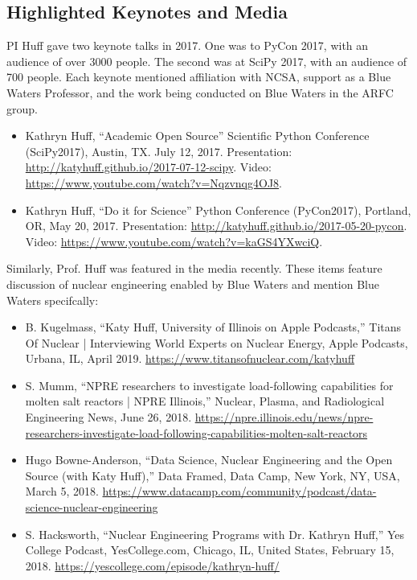 \documentclass[letterpaper]{article}
\begin{document}
\subsection{Highlighted Keynotes and Media}
PI Huff gave two keynote talks in 2017. One was to PyCon 2017, with an audience of over 3000 people. The 
second was at SciPy 2017, with an audience of 700 people. Each keynote 
mentioned affiliation with NCSA, support as a Blue Waters Professor, and 
the work being conducted on Blue Waters in the ARFC group. 


\begin{itemize}
\item Kathryn Huff, ``Academic Open Source'' Scientific Python Conference 
(SciPy2017), Austin, TX. July 12, 2017.  
Presentation: \url{http://katyhuff.github.io/2017-07-12-scipy}. Video: 
\url{https://www.youtube.com/watch?v=Nqzvnqg4OJ8}.
\item Kathryn Huff, ``Do it for Science'' Python Conference (PyCon2017),
Portland, OR, May 20, 2017. Presentation: \url{http://katyhuff.github.io/2017-05-20-pycon}.
Video: \url{https://www.youtube.com/watch?v=kaGS4YXwciQ}.
\end{itemize}

Similarly, Prof. Huff was featured in the media recently. These items 
feature discussion of nuclear engineering enabled by Blue Waters and mention 
Blue Waters specifcally:

\begin{itemize}
        \item B. Kugelmass, ``Katy Huff, University of Illinois on Apple 
                Podcasts,'' Titans Of Nuclear | Interviewing World Experts on 
                Nuclear Energy, Apple Podcasts, Urbana, IL, April 2019. 
                \url{https://www.titansofnuclear.com/katyhuff}
        \item S. Mumm, ``NPRE researchers to investigate load-following 
                capabilities for molten salt reactors | NPRE Illinois,'' 
                Nuclear, Plasma, and Radiological Engineering News, June 26, 
                2018. \url{https://npre.illinois.edu/news/npre-researchers-investigate-load-following-capabilities-molten-salt-reactors}
        \item Hugo Bowne-Anderson, ``Data Science, Nuclear Engineering and the 
                Open Source (with Katy Huff),'' Data Framed, Data Camp, New 
                York, NY, USA, March 5, 2018. \url{https://www.datacamp.com/community/podcast/data-science-nuclear-engineering}
        \item S. Hacksworth, ``Nuclear Engineering Programs with Dr. Kathryn 
                Huff,'' Yes College Podcast, YesCollege.com, Chicago, IL, 
                United States, February 15, 2018. \url{https://yescollege.com/episode/kathryn-huff/}
\end{itemize}
\end{document}
